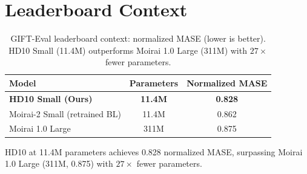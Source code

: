 \documentclass[letterpaper]{article}
\begin{document}
\section{Leaderboard Context}
\label{app:leaderboard}

\begin{table}[h]
\centering
\caption{GIFT-Eval leaderboard context: normalized MASE (lower is better). HD10 Small (11.4M) outperforms Moirai 1.0 Large (311M) with $27\times$ fewer parameters.}
\label{tab:leaderboard}
\small
\begin{tabular}{lcc}
\toprule
\textbf{Model} & \textbf{Parameters} & \textbf{Normalized MASE} \\
\midrule
\textbf{HD10 Small (Ours)} & \textbf{11.4M} & \textbf{0.828} \\
Moirai-2 Small (retrained BL) & 11.4M & 0.862 \\
Moirai 1.0 Large & 311M & 0.875 \\
\bottomrule
\end{tabular}
\end{table}

HD10 at 11.4M parameters achieves 0.828 normalized MASE, surpassing Moirai 1.0 Large (311M, 0.875) with $27\times$ fewer parameters.
\end{document}
